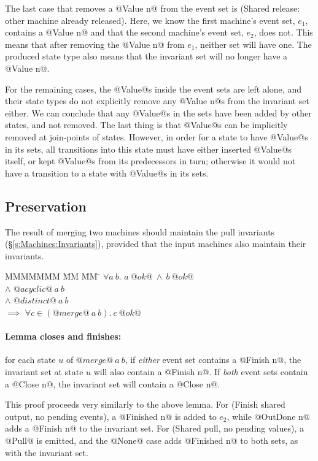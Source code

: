 The last case that removes a @Value n@ from the event set is (Shared release: other machine already released).
Here, we know the first machine's event set, $e_1$, contains a @Value n@ and that the second machine's event set, $e_2$, does not.
This means that after removing the @Value n@ from $e_1$, neither set will have one.
The produced state type also means that the invariant set will no longer have a @Value n@.

For the remaining cases, the @Value@s inside the event sets are left alone, and their state types do not explicitly remove any @Value n@s from the invariant set either.
We can conclude that any @Value@s in the sets have been added by other states, and not removed.
The last thing is that @Value@s can be implicitly removed at join-points of states.
However, in order for a state to have @Value@s in its sets, all transitions into this state must have either inserted @Value@s itself, or kept @Value@s from its predecessors in turn; otherwise it would not have a transition to a state with @Value@s in its sets.


\subsection{Preservation}
The result of merging two machines should maintain the pull invariants (\S\ref{s:Machines:Invariants}), provided that the input machines also maintain their invariants.

\begin{tabbing}
MMMMMMM \= MM \= MM \= \kill
$\forall a~b.$
\>
\> $a~@ok@~\wedge~b~@ok@$
\\
\> $\wedge$
\> $@acyclic@~a~b$
\\
\> $\wedge$
\> $@distinct@~a~b$
\\
\> $\implies$
\> $\forall c \in (@merge@~a~b).\ c~@ok@$
\end{tabbing}

\paragraph{Lemma closes and finishes:} 
for each state $u$ of $@merge@~a~b$, if \emph{either} event set contains a @Finish n@, the invariant set at state $u$ will also contain a @Finish n@.
If \emph{both} event sets contain a @Close n@, the invariant set will contain a @Close n@.

This proof proceeds very similarly to the above lemma.
For (Finish shared output, no pending events), a @Finished n@ is added to $e_2$, while @OutDone n@ adds a @Finish n@ to the invariant set.
For (Shared pull, no pending values), a @Pull@ is emitted, and the @None@ case adds @Finished n@ to both sets, as with the invariant set.


